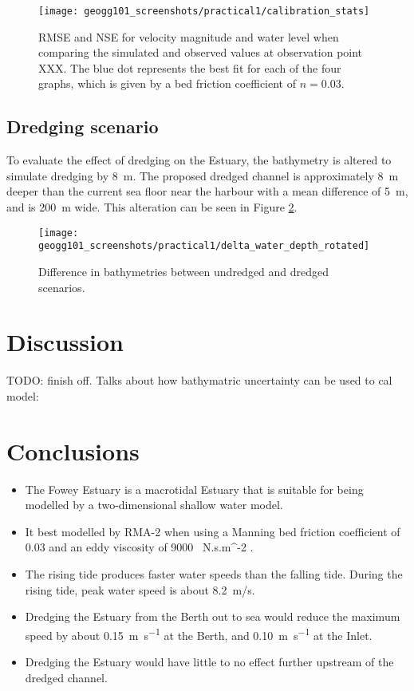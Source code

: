 \documentclass{article}
\begin{document}
\begin{figure}[hbp]
    \centering
    \texttt{[image: geogg101\_screenshots/practical1/calibration\_stats]}
    \caption{RMSE and NSE for velocity magnitude and water level when comparing the simulated and observed values at observation point XXX. The blue dot represents the best fit for each of the four graphs, which is given by a bed friction coefficient of $n = 0.03$.}
    \label{fig:calibration_stats}
\end{figure}

\subsection{Dredging scenario}

To evaluate the effect of dredging on the Estuary, the bathymetry is altered to simulate dredging by \SI{8}{m}. The proposed dredged channel is approximately \SI{8}{m} deeper than the current sea floor near the harbour with a mean difference of \SI{5}{m}, and is \SI{200}{m} wide. This alteration can be seen in Figure \ref{fig:delta_depth}.

\begin{figure}[hbp]
    \centering
    \texttt{[image: geogg101\_screenshots/practical1/delta\_water\_depth\_rotated]}
    \caption{Difference in bathymetries between undredged and dredged scenarios.}
    \label{fig:delta_depth}
\end{figure}

\newpage
\section{Discussion}

TODO: finish off. Talks about how bathymatric uncertainty can be used to cal model: \textcite{cea2012bathymetric}

\section{Conclusions}


\begin{itemize}
    \item The Fowey Estuary is a macrotidal Estuary that is suitable for being modelled by a two-dimensional shallow water model.
    \item It best modelled by RMA-2 when using a Manning bed friction coefficient of 0.03 and an eddy viscosity of \SI{9000}{ N.s.m^{-2} }.
    \item The rising tide produces faster water speeds than the falling tide. During the rising tide, peak water speed is about \SI{8.2}{m/s}.
    \item Dredging the Estuary from the Berth out to sea would reduce the maximum speed by about \SI{0.15}{m.s^{-1}} at the Berth, and \SI{0.10}{m.s^{-1}} at the Inlet.
    \item Dredging the Estuary would have little to no effect further upstream of the dredged channel.
\end{itemize}
\end{document}
